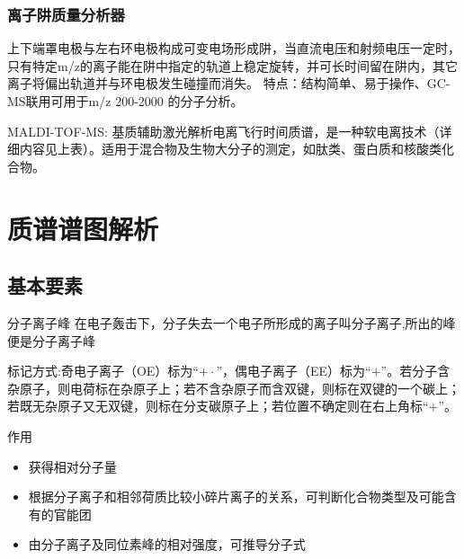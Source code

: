 \subsubsection*{离子阱质量分析器}
上下端罩电极与左右环电极构成可变电场形成阱，当直流电压和射频电压一定时，只有特定m/z的离子能在阱中指定的轨道上稳定旋转，并可长时间留在阱内，其它离子将偏出轨道并与环电极发生碰撞而消失。
特点：结构简单、易于操作、GC-MS联用可用于m/z 200-2000 的分子分析。

\begin{definition*}{MALDI-TOF-MS:}
    基质辅助激光解析电离飞行时间质谱，是一种软电离技术（详细内容见上表）。适用于混合物及生物大分子的测定，如肽类、蛋白质和核酸类化合物。
\end{definition*}

\section{质谱谱图解析}
\subsection{基本要素}
\begin{definition*}{分子离子峰}
    在电子轰击下，分子失去一个电子所形成的离子叫分子离子,所出的峰便是分子离子峰
\end{definition*}
\begin{note}
    标记方式:奇电子离子（OE）标为“$+\cdot$”，偶电子离子（EE）标为“$+$”。若分子含杂原子，则电荷标在杂原子上；若不含杂原子而含双键，则标在双键的一个碳上；若既无杂原子又无双键，则标在分支碳原子上；若位置不确定则在右上角标“$+$”。
\end{note}

作用
\begin{itemize}
    \item 获得相对分子量
    \item 根据分子离子和相邻荷质比较小碎片离子的关系，可判断化合物类型及可能含有的官能团
    \item 由分子离子及同位素峰的相对强度，可推导分子式
\end{itemize}

